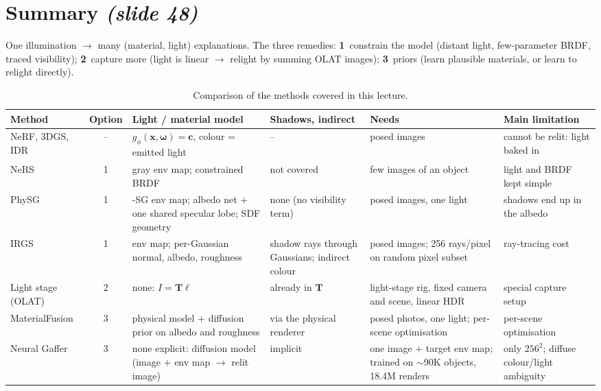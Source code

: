 \documentclass[11pt,a4paper]{article}
\newcommand{\slideone}[1]{\texorpdfstring{\emph{(slide #1)}}{(slide #1)}}
\newcommand{\x}{{\bm{x}}}
\newcommand{\w}{{\bm{\omega}}}
\theoremstyle{definition}
\theoremstyle{plain}
\theoremstyle{remark}
\begin{document}
\section{Summary \slideone{48}}

One illumination $\to$ many (material, light) explanations. The three remedies:
\textbf{1}~constrain the model (distant light, few-parameter BRDF, traced visibility); \textbf{2}~capture more (light is linear $\to$ relight by summing OLAT images); \textbf{3}~priors (learn plausible materials, or learn to relight directly).

\begin{table}[!htbp]
\centering\small
\renewcommand{\arraystretch}{1.25}
\begin{tabularx}{\textwidth}{>{\raggedright\arraybackslash}p{2.3cm}c>{\raggedright\arraybackslash}X>{\raggedright\arraybackslash}X>{\raggedright\arraybackslash}X>{\raggedright\arraybackslash}X}
\toprule
\textbf{Method} & \textbf{Option} & \textbf{Light / material model} & \textbf{Shadows, indirect} & \textbf{Needs} & \textbf{Main limitation}\\
\midrule
NeRF, 3DGS, IDR & -- & $g_\phi(\x,\w)=\bm c$, colour = emitted light & -- & posed images & cannot be relit: light baked in\\
NeRS & 1 & gray env map; constrained BRDF & not covered & few images of an object & light and BRDF kept simple\\
PhySG & 1 & 128-SG env map; albedo net + one shared specular lobe; SDF geometry & none (no visibility term) & posed images, one light & shadows end up in the albedo\\
IRGS & 1 & env map; per-Gaussian normal, albedo, roughness & shadow rays through Gaussians; indirect colour & posed images; 256 rays/pixel on random pixel subset & ray-tracing cost\\
Light stage (OLAT) & 2 & none: $I=\bm T\bm\ell$ & already in $\bm T$ & light-stage rig, fixed camera and scene, linear HDR & special capture setup\\
MaterialFusion & 3 & physical model + diffusion prior on albedo and roughness & via the physical renderer & posed photos, one light; per-scene optimisation & per-scene optimisation\\
Neural Gaffer & 3 & none explicit: diffusion model (image + env map $\to$ relit image) & implicit & one image + target env map; trained on ${\sim}$90K objects, 18.4M renders & only $256^2$; diffuse colour/light ambiguity\\
\bottomrule
\end{tabularx}
\caption{Comparison of the methods covered in this lecture.}
\end{table}
\end{document}
